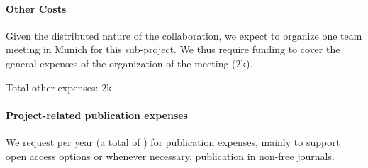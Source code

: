 \documentclass[10pt,fleqn,twoside]{article}
\begin{document}
\paragraph{Other Costs}

Given the distributed nature of the collaboration, we expect to organize one team meeting in 
Munich for this sub-project. We thus require funding to cover the general expenses of the 
organization of the meeting (2k\EUR{}).\smallskip
 

Total other expenses: 2k\EUR{}

\paragraph{Project-related publication expenses}

We request  per year (a total of ) for publication
expenses, mainly to support open access options or whenever necessary,
publication in non-free journals.







% 
% 
% 
% 
% 
% 
% 
\end{document}
